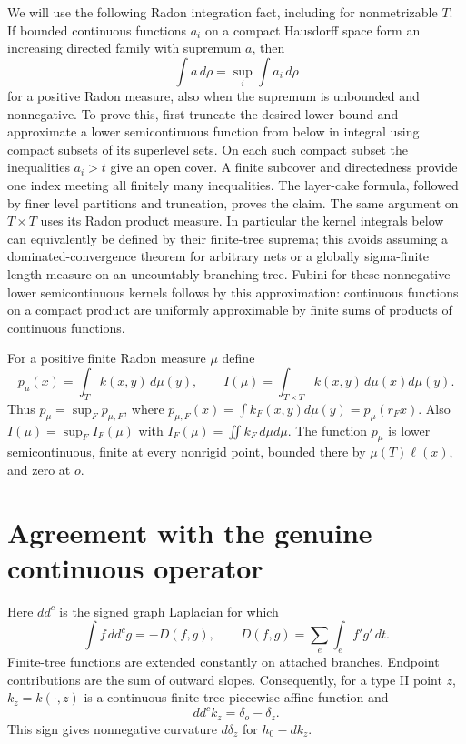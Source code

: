 \documentclass[
  11pt,
]{article}
\begin{document}
We will use the following Radon integration fact, including for
nonmetrizable \(T\). If bounded continuous functions \(a_i\) on a
compact Hausdorff space form an increasing directed family with supremum
\(a\), then \[
\int a\,d\rho=\sup_i\int a_i\,d\rho
\] for a positive Radon measure, also when the supremum is unbounded and
nonnegative. To prove this, first truncate the desired lower bound and
approximate a lower semicontinuous function from below in integral using
compact subsets of its superlevel sets. On each such compact subset the
inequalities \(a_i>t\) give an open cover. A finite subcover and
directedness provide one index meeting all finitely many inequalities.
The layer-cake formula, followed by finer level partitions and
truncation, proves the claim. The same argument on \(T\times T\) uses
its Radon product measure. In particular the kernel integrals below can
equivalently be defined by their finite-tree suprema; this avoids
assuming a dominated-convergence theorem for arbitrary nets or a
globally sigma-finite length measure on an uncountably branching tree.
Fubini for these nonnegative lower semicontinuous kernels follows by
this approximation: continuous functions on a compact product are
uniformly approximable by finite sums of products of continuous
functions.

For a positive finite Radon measure \(\mu\) define \[
p_\mu(x)=\int_T k(x,y)\,d\mu(y),\qquad
I(\mu)=\int_{T\times T}k(x,y)\,d\mu(x)d\mu(y).
\] Thus \(p_\mu=\sup_F p_{\mu,F}\), where
\(p_{\mu,F}(x)=\int k_F(x,y)d\mu(y)=p_\mu(r_Fx)\). Also
\(I(\mu)=\sup_F I_F(\mu)\) with \(I_F(\mu)=\iint k_F\,d\mu d\mu\). The
function \(p_\mu\) is lower semicontinuous, finite at every nonrigid
point, bounded there by \(\mu(T)\ell(x)\), and zero at \(o\).

\section{Agreement with the genuine continuous
operator}\label{agreement-with-the-genuine-continuous-operator}

Here \(dd^c\) is the signed graph Laplacian for which \[
\int f\,dd^c g=-D(f,g),\qquad
D(f,g)=\sum_{e}\int_e f'g'\,dt.
\] Finite-tree functions are extended constantly on attached branches.
Endpoint contributions are the sum of outward slopes. Consequently, for
a type II point \(z\), \(k_z=k(\cdot,z)\) is a continuous finite-tree
piecewise affine function and \[
dd^c k_z=\delta_o-\delta_z.
\] This sign gives nonnegative curvature \(d\delta_z\) for \(h_0-dk_z\).
\end{document}
